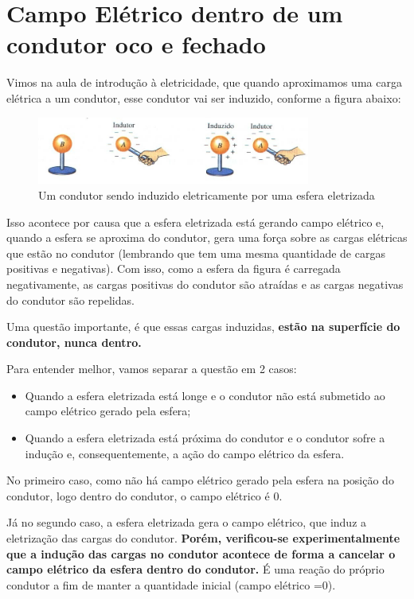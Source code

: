 \documentclass[12pt]{extarticle}
\newcommand{\<}{\langle}
\renewcommand{\>}{\rangle}
\theoremstyle{definition}
\begin{document}
\section{Campo Elétrico dentro de um condutor oco e fechado}

Vimos na aula de introdução à eletricidade, que quando aproximamos uma carga elétrica a um condutor, esse condutor vai ser induzido, conforme a figura abaixo:
\begin{figure}[H]
    \centering
    \includegraphics[width=0.8\textwidth]{eletrizacao_por_inducao.jpg}
    \caption{Um condutor sendo induzido eletricamente por uma esfera eletrizada}
    \label{fig:induction}
\end{figure}

Isso acontece por causa que a esfera eletrizada está gerando campo elétrico e, quando a esfera se aproxima do condutor, gera uma força sobre as cargas elétricas que estão no condutor (lembrando que tem uma mesma quantidade de cargas positivas e negativas). Com isso, como a esfera da figura é carregada negativamente, as cargas positivas do condutor são atraídas e as cargas negativas do condutor são repelidas. 

Uma questão importante, é que essas cargas induzidas, \textbf{estão na superfície do condutor, nunca dentro.}

Para entender melhor, vamos separar a questão em 2 casos:
\begin{itemize}
    \item Quando a esfera eletrizada está longe e o condutor não está submetido ao campo elétrico gerado pela esfera;
    \item Quando a esfera eletrizada está próxima do condutor e o condutor sofre a indução e, consequentemente, a ação do campo elétrico da esfera.
\end{itemize}

No primeiro caso, como não há campo elétrico gerado pela esfera na posição do condutor, logo dentro do condutor, o campo elétrico é 0.

Já no segundo caso, a esfera eletrizada gera o campo elétrico, que induz a eletrização das cargas do condutor. \textbf{Porém, verificou-se experimentalmente que a indução das cargas no condutor acontece de forma a cancelar o campo elétrico da esfera dentro do condutor.} É uma reação do próprio condutor a fim de manter a quantidade inicial (campo elétrico =0).
\end{document}
